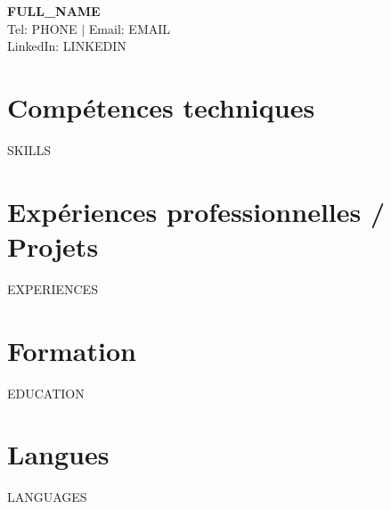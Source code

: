 \documentclass[11pt,a4paper]{article}
\begin{document}
\pagestyle{empty}

\begin{center}
    {\Huge\bfseries {{FULL_NAME}}} \\[0.3cm]
    Tel: {{PHONE}} \quad $|$ \quad
    Email: {{EMAIL}} \\
    LinkedIn: {{LINKEDIN}}
\end{center}

\vspace{0.5cm}

\section*{Compétences techniques}
\begin{itemize}
{{SKILLS}}
\end{itemize}

\vspace{0.3cm}

\section*{Expériences professionnelles / Projets}

{{EXPERIENCES}}

\vspace{0.3cm}

\section*{Formation}

{{EDUCATION}}

\vspace{0.3cm}

\section*{Langues}

\begin{itemize}
{{LANGUAGES}}
\end{itemize}
\end{document}
